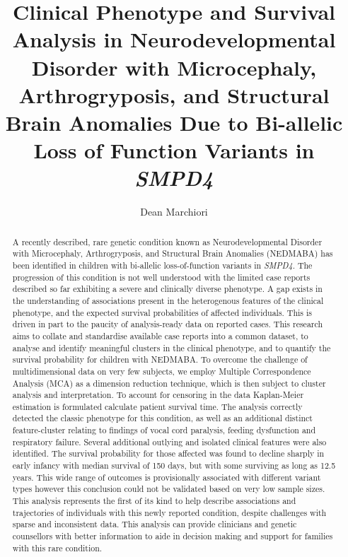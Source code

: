 \documentclass[
  authoryear,
  preprint,
  3p]{elsarticle}
\begin{document}
\begin{frontmatter}
\title{Clinical Phenotype and Survival Analysis in Neurodevelopmental
Disorder with Microcephaly, Arthrogryposis, and Structural Brain
Anomalies Due to Bi-allelic Loss of Function Variants in \emph{SMPD4}}
\author[]{Dean Marchiori%
%
}



        
\begin{abstract}
A recently described, rare genetic condition known as Neurodevelopmental
Disorder with Microcephaly, Arthrogryposis, and Structural Brain
Anomalies (NEDMABA) has been identified in children with bi-allelic
loss-of-function variants in \emph{SMPD4}. The progression of this
condition is not well understood with the limited case reports described
so far exhibiting a severe and clinically diverse phenotype. A gap
exists in the understanding of associations present in the heterogenous
features of the clinical phenotype, and the expected survival
probabilities of affected individuals. This is driven in part to the
paucity of analysis-ready data on reported cases. This research aims to
collate and standardise available case reports into a common dataset, to
analyse and identify meaningful clusters in the clinical phenotype, and
to quantify the survival probability for children with NEDMABA. To
overcome the challenge of multidimensional data on very few subjects, we
employ Multiple Correspondence Analysis (MCA) as a dimension reduction
technique, which is then subject to cluster analysis and interpretation.
To account for censoring in the data Kaplan-Meier estimation is
formulated calculate patient survival time. The analysis correctly
detected the classic phenotype for this condition, as well as an
additional distinct feature-cluster relating to findings of vocal cord
paralysis, feeding dysfunction and respiratory failure. Several
additional outlying and isolated clinical features were also identified.
The survival probability for those affected was found to decline sharply
in early infancy with median survival of 150 days, but with some
surviving as long as 12.5 years. This wide range of outcomes is
provisionally associated with different variant types however this
conclusion could not be validated based on very low sample sizes. This
analysis represents the first of its kind to help describe associations
and trajectories of individuals with this newly reported condition,
despite challenges with sparse and inconsistent data. This analysis can
provide clinicians and genetic counsellors with better information to
aide in decision making and support for families with this rare
condition.
\end{abstract}






\end{frontmatter}
\end{document}
